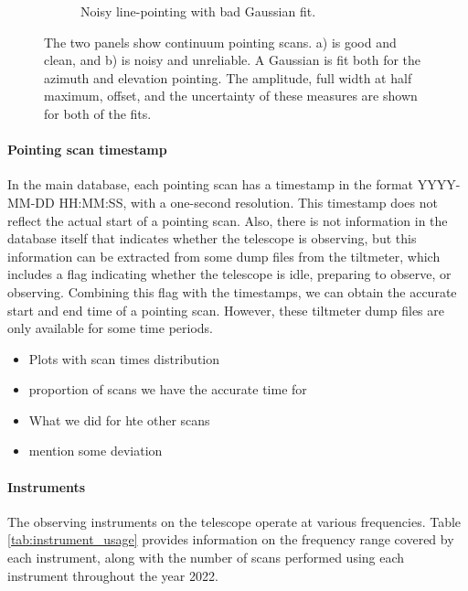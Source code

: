 \begin{figure}[H]
\begin{subfigure}[b]{0.75\textwidth}
         \caption{Noisy line-pointing with bad Gaussian fit.}
         \label{subfig:bad_continuous}
     \end{subfigure}
    \caption{The two panels show continuum pointing scans. a) is good and clean, and b) is noisy and unreliable. A Gaussian is fit both for the azimuth and elevation pointing. The amplitude, full width at half maximum, offset, and the uncertainty of these measures are shown for both of the fits.}
    \label{fig:continueous_pointings}
\end{figure}



\paragraph{Pointing scan timestamp} 
In the main database, each pointing scan has a timestamp in the format YYYY-MM-DD HH:MM:SS, with a one-second resolution. This timestamp does not reflect the actual start of a pointing scan. Also, there is not information in the database itself that indicates whether the telescope is observing, but this information can be extracted from some dump files from the tiltmeter, which includes a flag indicating whether the telescope is idle, preparing to observe, or observing. Combining this flag with the timestamps, we can obtain the accurate start and end time of a pointing scan. However, these tiltmeter dump files are only available for some time periods.

\begin{itemize}
    \item Plots with scan times distribution
    \item proportion of scans we have the accurate time for
    \item What we did for hte other scans
    \item mention some deviation
\end{itemize}

\paragraph{Instruments}
The observing instruments on the telescope operate at various frequencies.
Table \ref{tab:instrument_usage} provides information on the frequency range covered by each instrument,
along with the number of scans performed using each instrument throughout the year 2022.\\


